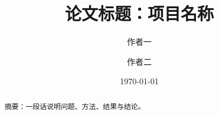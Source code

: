 \documentclass[11pt]{ctexart}
\title{论文标题：项目名称}
\author{作者一 \and 作者二}
\date{\today}
\begin{document}
\maketitle

\begin{abstract}
摘要：一段话说明问题、方法、结果与结论。
\end{abstract}








\end{document}
